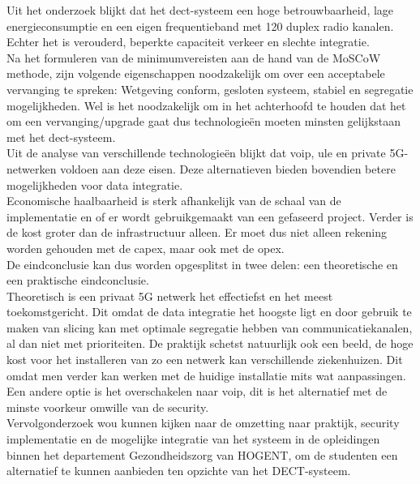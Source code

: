 Uit het onderzoek blijkt dat het \gls{dect}-systeem een  hoge betrouwbaarheid, lage energieconsumptie en een eigen frequentieband met 120 duplex radio kanalen. Echter het is verouderd,  beperkte capaciteit verkeer en slechte integratie. \\

Na het formuleren van de minimumvereisten aan de hand van de MoSCoW methode, zijn volgende eigenschappen noodzakelijk om over een acceptabele vervanging te spreken: Wetgeving conform, gesloten systeem, stabiel en segregatie mogelijkheden. Wel is het noodzakelijk om in het achterhoofd te houden dat het om een vervanging/upgrade gaat dus technologieën moeten minsten gelijkstaan met het \gls{dect}-systeem.\\
Uit de analyse van verschillende technologieën blijkt dat \gls{voip}, \gls{ule} en private 5G-netwerken voldoen aan deze eisen. Deze alternatieven bieden bovendien betere mogelijkheden voor data integratie.\\
Economische haalbaarheid is sterk afhankelijk van de schaal van de implementatie en of er wordt gebruikgemaakt van een gefaseerd project. Verder is de kost groter dan de infrastructuur alleen. Er moet dus niet alleen rekening worden gehouden met de \gls{capex}, maar ook met de \gls{opex}.\\

De eindconclusie kan dus worden opgesplitst in twee delen: een theoretische en een praktische eindconclusie.\\
Theoretisch is een privaat 5G netwerk het effectiefst en het meest toekomstgericht. Dit omdat de data integratie het hoogste ligt en door gebruik te maken van slicing kan met optimale segregatie hebben van communicatiekanalen, al dan niet met prioriteiten. De praktijk schetst natuurlijk ook een beeld, de hoge kost voor het installeren van zo een netwerk kan verschillende ziekenhuizen. Dit omdat men verder kan werken met de huidige installatie mits wat aanpassingen. Een andere optie is het overschakelen naar \gls{voip}, dit is het alternatief met de minste voorkeur omwille van de security.\\

Vervolgonderzoek wou kunnen kijken naar de omzetting naar praktijk, security implementatie en de mogelijke integratie van het systeem in de opleidingen binnen het departement Gezondheidszorg van HOGENT, om de studenten een alternatief te kunnen aanbieden ten opzichte van het DECT-systeem.



